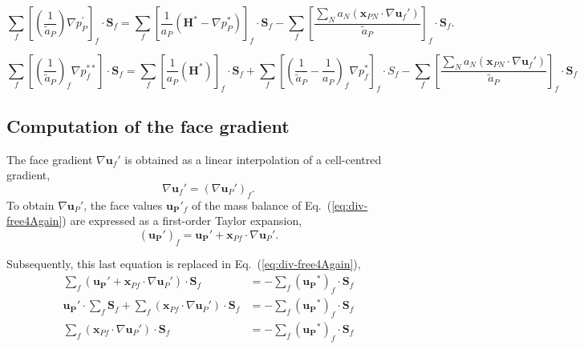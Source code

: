\documentclass[final,3p,times,10pt,onecolumn]{myElsarticle}
\numberwithin{equation}{section}
\begin{document}
\begin{equation}
\label{eq:pEqnCOMPLEX1}
\sum_f 
\left[
\left(
\frac
{
1
}
{
\tilde{a}_P
}
\right)
\nabla p_P^{'}
\right]_f
\cdot 
\boldsymbol{S}_f
= 
\sum_f 
\left[
\frac{1}{a_P}
\left(
\boldsymbol{H}^* - \nabla p_P^{*}
\right)
\right]_f 
\cdot
\boldsymbol{S}_f
-
\sum_f 
\left[
\dfrac
{
\sum_{N} a_{N} 
( 
\boldsymbol{x}_{PN} 
\cdot
\nabla \boldsymbol{u}_f' 
)
}
{\tilde{a}_P}
\right]_f 
\cdot
\boldsymbol{S}_f.
\end{equation}

\begin{equation}
\label{Eq:complexSemiFinal}
\sum_f
\left[
\left(
\dfrac
{1}
{\tilde{a}_P}
\right)_f
\nabla p^{**}_f
\right]
\cdot 
\boldsymbol{S}_f
= 
\sum_f 
\left[
\frac{1}{a_P}
\left(
\boldsymbol{H}^*
\right)
\right]_f 
\cdot
\boldsymbol{S}_f
+
\sum_f
\left[
\left(
\dfrac
{1}
{\tilde{a}_P}
-
\dfrac
{1}
{a_P}
\right)_f
\nabla p^{*}_f
\right]_f
\cdot
S_f
-
\sum_f 
\left[
\dfrac
{
\sum_{N} a_{N} 
( 
\boldsymbol{x}_{PN} 
\cdot
\nabla \boldsymbol{u}_f' 
)
}
{\tilde{a}_P}
\right]_f 
\cdot
\boldsymbol{S}_f
\end{equation}

\subsection{Computation of the face gradient}
The face gradient $\nabla \boldsymbol{u}_f' $ is obtained as a linear interpolation of a cell-centred gradient,
\begin{equation}
\label{Eq:UFaceGradient}
\nabla \boldsymbol{u}_f'
=
(\nabla \boldsymbol{u}_P')_f.
\end{equation}
To obtain $\nabla \boldsymbol{u}_P'$, the face values $\boldsymbol{u_P}'_f$ of the mass balance of Eq.~(\ref{eq:div-free4Again}) are expressed as a  first-order Taylor expansion,
\begin{equation}
\label{Eq:TaylorOnFace}
\left(
\boldsymbol{u_P}'
\right)_f
=
\boldsymbol{u_P}'
+
\boldsymbol{x}_{Pf}
\cdot 
\nabla \boldsymbol{u}_P'.
\end{equation} 


Subsequently, this last equation is replaced in  Eq.~(\ref{eq:div-free4Again}),
\begin{align}
\sum_f 
\left(
\boldsymbol{u_P}'
+
\boldsymbol{x}_{Pf}
\cdot 
\nabla \boldsymbol{u}_P'
\right)
\cdot 
\boldsymbol{S}_f 
&=
-\sum_f
\left(
\boldsymbol{u_P}^{*}
\right)_{f} 
\cdot 
\boldsymbol{S}_f
\\
\boldsymbol{u_P}'
\cdot 
\sum_f 
\boldsymbol{S}_f
+
\sum_f 
\left(
\boldsymbol{x}_{Pf}
\cdot 
\nabla \boldsymbol{u}_P'
\right)
\cdot 
\boldsymbol{S}_f
&=
-\sum_f
\left(
\boldsymbol{u_P}^{*}
\right)_{f} 
\cdot 
\boldsymbol{S}_f
\\
\label{Eq:Last}
\sum_f 
\left(
\boldsymbol{x}_{Pf}
\cdot 
\nabla \boldsymbol{u}_P'
\right)
\cdot 
\boldsymbol{S}_f
&=
-\sum_f
\left(
\boldsymbol{u_P}^{*}
\right)_{f} 
\cdot 
\boldsymbol{S}_f
\end{align}
\end{document}
